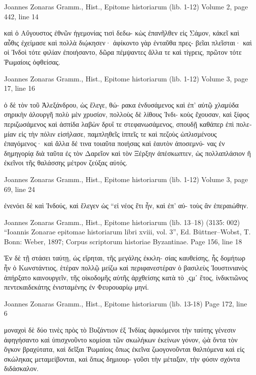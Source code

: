 \documentclass[12pt,letterpaper,twoside,final]{memoir}
\begin{document}
\begin{greek}
Joannes Zonaras Gramm., Hist., Epitome historiarum (lib. 1-12) 
Volume 2, page 442, line 14

         καὶ ὁ Αὔγουστος ἐθνῶν ἡγεμονίας τισὶ δεδω-
κὼς ἐπανῆλθεν εἰς Σάμον, κἀκεῖ καὶ αὖθις ἐχείμασε 
καὶ πολλὰ διῴκησεν· ἀφίκοντο γὰρ ἐνταῦθα πρες-
βεῖαι πλεῖσται· καὶ οἱ Ἰνδοὶ τότε φιλίαν ἐποιήσαντο, 
δῶρα πέμψαντες ἄλλα τε καὶ τίγρεις, πρῶτον τότε 
Ῥωμαίοις ὀφθείσας. 



Joannes Zonaras Gramm., Hist., Epitome historiarum (lib. 1-12) 
Volume 3, page 17, line 16

           ὁ δὲ τὸν τοῦ Ἀλεξάνδρου, ὡς ἔλεγε, θώ-
ρακα ἐνδυσάμενος καὶ ἐπ' αὐτῷ χλαμύδα σηρικὴν 
ἁλουργῆ πολὺ μὲν χρυσίον, πολλοὺς δὲ λίθους Ἰνδι-
κοὺς ἔχουσαν, καὶ ξίφος περιζωσάμενος καὶ ἀσπίδα 
λαβὼν δρυΐ τε στεφανωσάμενος, σπουδῇ καθάπερ 
ἐπὶ πολεμίαν εἰς τὴν πόλιν εἰσήλασε, παμπληθεῖς 
ἱππεῖς τε καὶ πεζοὺς ὡπλισμένους ἐπαγόμενος· καὶ 
ἄλλα δέ τινα τοιαῦτα ποιήσας καὶ ἑαυτὸν ἀποσεμνύ-
νας ἐν δημηγορίᾳ διὰ ταῦτα ἐς τὸν Δαρεῖον καὶ τὸν 
Ξέρξην ἀπέσκωπτεν, ὡς πολλαπλάσιον ἢ ἐκεῖνοι τῆς 
θαλάσσης μέτρον ζεύξας αὐτός. 



Joannes Zonaras Gramm., Hist., Epitome historiarum (lib. 1-12) 
Volume 3, page 69, line 24

                                         ἐνενόει δὲ καὶ 
Ἰνδούς, καὶ ἔλεγεν ὡς “εἰ νέος ἔτι ἦν, καὶ ἐπ' αὐ-
τοὺς ἂν ἐπεραιώθην. 



Joannes Zonaras Gramm., Hist., Epitome historiarum (lib. 13–18) (3135: 002)
“Ioannis Zonarae epitomae historiarum libri xviii, vol. 3”, Ed. Büttner–Wobst, T.
Bonn: Weber, 1897; Corpus scriptorum historiae Byzantinae.
Page 156, line 18

Ἐν δὲ τῇ στάσει ταύτῃ, ὡς εἴρηται, τῆς μεγάλης ἐκκλη-
σίας καυθείσης, ἧς δομήτωρ ἦν ὁ Κωνστάντιος, ἑτέραν πολλῷ 
μείζω καὶ περιφανεστέραν ὁ βασιλεὺς Ἰουστινιανὸς ἀπήρξατο 
καινουργεῖν, τῆς οἰκοδομῆς αὐτῆς ἀρχθείσης κατὰ τὸ ͵ϛμʹ ἔτος, 
ἰνδικτιῶνος πεντεκαιδεκάτης ἐνισταμένης ἐν Φευρουαρίῳ μηνί. 



Joannes Zonaras Gramm., Hist., Epitome historiarum (lib. 13-18) 
Page 172, line 6

               μοναχοὶ δὲ δύο τινὲς πρὸς τὸ Βυζάντιον ἐξ Ἰνδίας 
ἀφικόμενοι τὴν ταύτης γένεσιν ἀφηγήσαντο καὶ ὑπισχνοῦντο 
κομίσαι τῶν σκωλήκων ἐκείνων γόνον, ᾠὰ ὄντα τὸν ὄγκον 
βραχύτατα, καὶ δεῖξαι Ῥωμαίοις ὅπως ἐκεῖνα ζωογονοῦνται 
θαλπόμενα καὶ εἰς σκώληκας μεταμείβονται, καὶ ὅπως δημιουρ-
γοῦσι τὴν μέταξαν, τὴν φύσιν σχόντα διδάσκαλον. 




\end{greek}
\end{document}
